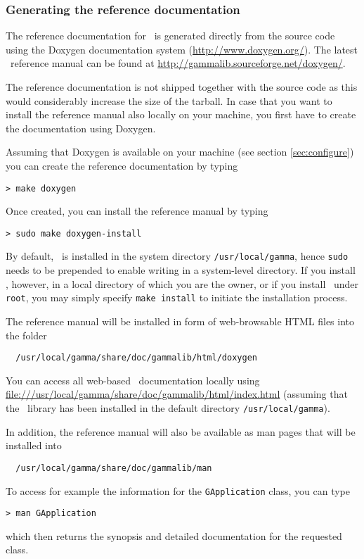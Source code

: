 \documentclass{article}[12pt,a4]
\begin{document}
\subsubsection{Generating the reference documentation}
\label{sec:doxygen}

The reference documentation for \this\ is generated directly from the source code using
the Doxygen documentation system (\url{http://www.doxygen.org/}).
The latest \this\ reference manual can be found at 
\url{http://gammalib.sourceforge.net/doxygen/}.

The reference documentation is not shipped together with the source code as this
would considerably increase the size of the tarball.
In case that you want to install the reference manual also locally on your machine, you
first have to create the documentation using Doxygen.

Assuming that Doxygen is available on your machine (see section \ref{sec:configure})
you can create the reference documentation by typing
\begin{verbatim}
> make doxygen
\end{verbatim}
Once created, you can install the reference manual by typing
\begin{verbatim}
> sudo make doxygen-install
\end{verbatim}
By default, \this\ is installed in the system directory {\tt /usr/local/gamma}, hence
{\tt sudo} needs to be prepended to enable writing in a system-level directory.
If you install \this, however, in a local directory of which you are the owner, or if you install
\this\ under {\tt root}, you may simply specify {\tt make install} to initiate the installation
process.

The reference manual will be installed in form of web-browsable HTML files into
the folder
\begin{verbatim}
  /usr/local/gamma/share/doc/gammalib/html/doxygen
\end{verbatim}
You can access all web-based \this\ documentation locally using
\url{file:///usr/local/gamma/share/doc/gammalib/html/index.html}
(assuming that the \this\ library has been installed in the default directory {\tt /usr/local/gamma}).

In addition, the reference manual will also be available as man pages that will be installed
into
\begin{verbatim}
  /usr/local/gamma/share/doc/gammalib/man
\end{verbatim}
To access for example the information for the {\tt GApplication} class, you can type
\begin{verbatim}
> man GApplication
\end{verbatim}
which then returns the synopsis and detailed documentation for the requested class.
\end{document}
